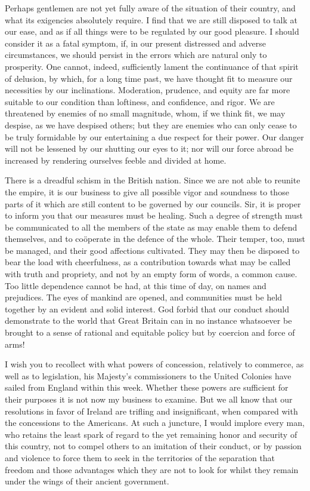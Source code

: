 Perhaps gentlemen are not yet fully aware of the situation of their country, and what its exigencies absolutely require. I find that we are still disposed to talk at our ease, and as if all things were to be regulated by our good pleasure. I should consider it as a fatal symptom, if, in our present distressed and adverse circumstances, we should persist in the errors which are natural only to prosperity. One cannot, indeed, sufficiently lament the continuance of that spirit of delusion, by which, for a long time past, we have thought fit to measure our necessities by our inclinations. Moderation, prudence, and equity are far more suitable to our condition than loftiness, and confidence, and rigor. We are threatened by enemies of no small magnitude, whom, if we think fit, we may despise, as we have despised others; but they are enemies who can only cease to be truly formidable by our entertaining a due respect for their power. Our danger will not be lessened by our shutting our eyes to it; nor will our force abroad be increased by rendering ourselves feeble and divided at home.

There is a dreadful schism in the British nation. Since we are not able to reunite the empire, it is our business to give all possible vigor and soundness to those parts of it which are still content to be governed by our councils. Sir, it is proper to inform you that our measures must be healing. Such a degree of strength must be communicated to all the members of the state as may enable them to defend themselves, and to coöperate in the defence of the whole. Their temper, too, must be managed, and their good affections cultivated. They may then be disposed to bear the load with cheerfulness, as a contribution towards what may be called with truth and propriety, and not by an empty form of words, a common cause. Too little dependence cannot be had, at this time of day, on names and prejudices. The eyes of mankind are opened, and communities must be held together by an evident and solid interest. God forbid that our conduct should demonstrate to the world that Great Britain can in no instance whatsoever be brought to a sense of rational and equitable policy but by coercion and force of arms!

I wish you to recollect with what powers of concession, relatively to commerce, as well as to legislation, his Majesty's commissioners to the United Colonies have sailed from England within this week. Whether these powers are sufficient for their purposes it is not now my business to examine. But we all know that our resolutions in favor of Ireland are trifling and insignificant, when compared with the concessions to the Americans. At such a juncture, I would implore every man, who retains the least spark of regard to the yet remaining honor and security of this country, not to compel others to an imitation of their conduct, or by passion and violence to force them to seek in the territories of the separation that freedom and those advantages which they are not to look for whilst they remain under the wings of their ancient government.

